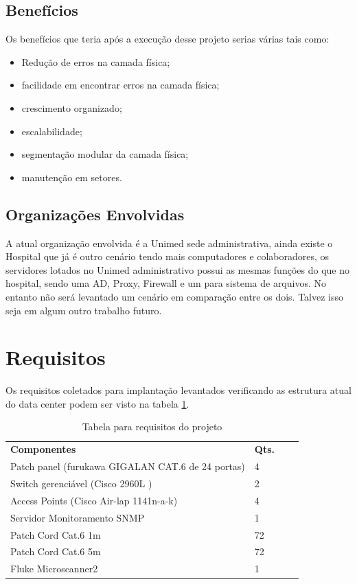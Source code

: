 \documentclass[	DIV=calc,%
							paper=a4,%
							fontsize=12pt,%
							onecolumn]{scrartcl}	 					%
\begin{document}
\subsection{Benefícios}
Os benefícios que teria após a execução desse projeto serias várias tais como: 

\begin{itemize}
	\item Redução de erros na camada física;
	\item facilidade em encontrar erros na camada física;
	\item crescimento organizado;
	\item escalabilidade;
	\item segmentação modular da camada física;
	\item manutenção em setores.
\end{itemize}
 
\subsection{Organizações Envolvidas}
A atual organização envolvida é a Unimed sede administrativa, ainda existe o Hospital que já é outro cenário tendo mais computadores e colaboradores, os servidores lotados no Unimed administrativo possui as mesmas funções do que no hospital, sendo uma AD, Proxy, Firewall e um para sistema de arquivos. No entanto não será levantado um cenário em comparação entre os dois. Talvez isso seja em algum outro trabalho futuro.


\section{Requisitos}\label{sec:Requisitos}
Os requisitos coletados para implantação levantados verificando as estrutura atual do data center podem ser visto na tabela \ref{tab:requisitos}.

\begin{table}[!htbp]
	\centering
	\begin{tabular}{|l|l|ll}
		\cline{1-2}
		\textbf{Componentes}        & \textbf{Qts.} &  &   \\
		\cline{1-2}
		Patch panel (furukawa GIGALAN CAT.6 de 24 portas) & 4    &  &   \\
		Switch gerenciável (Cisco 2960L ) & 2    &  &   \\
		Access Points 	   (Cisco Air-lap 1141n-a-k) & 4    &  &   \\
		Servidor Monitoramento SNMP 	   & 1    &  &   \\	
		Patch Cord Cat.6  1m	   & 72    &  &   \\
		Patch Cord Cat.6  5m	   & 72    &  &   \\
		Fluke Microscanner2	   & 1    &  &   \\
		\cline{1-2} 
	\end{tabular}
		\caption{Tabela para requisitos do projeto}\label{tab:requisitos}
\end{table}
\end{document}
